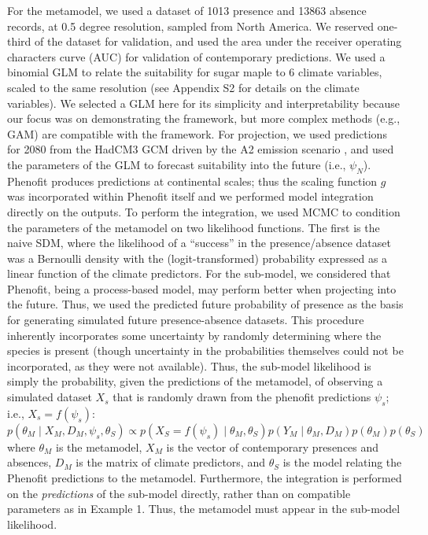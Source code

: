 \documentclass[11pt]{article}
\begin{document}
For the metamodel, we used a dataset of 1013 presence and 13863 absence records, at 0.5 degree resolution, sampled from North America.
We reserved one-third of the dataset for validation, and used the area under the receiver operating characters curve (AUC) for validation of contemporary predictions.
We used a binomial GLM to relate the suitability for sugar maple to 6 climate variables, scaled to the same resolution (see Appendix S2 for details on the climate variables).
We selected a GLM here for its simplicity and interpretability because our focus was on demonstrating the framework, but more complex methods (e.g., GAM) are compatible with the framework.
For projection, we used predictions for 2080 from the HadCM3 GCM \citep{Pope2000} driven by the A2 emission scenario \citep{Nakicenovic2000}, and used the parameters of the GLM to forecast suitability into the future (i.e., \(\psi_N\)).
Phenofit produces predictions at continental scales; thus the scaling function \(g\) was incorporated within Phenofit itself and we performed model integration directly on the outputs.
To perform the integration, we used \ac{MCMC} to condition the parameters of the metamodel  on two likelihood functions.
The first is the naive SDM, where the likelihood of a ``success'' in the presence/absence dataset was a Bernoulli density with the (logit-transformed) probability expressed as a linear function of the climate predictors.
For the sub-model, we considered that Phenofit, being a process-based model, may perform better when projecting into the future.
Thus, we used the predicted future probability of presence as the basis for generating simulated future presence-absence datasets.
This procedure inherently incorporates some uncertainty by randomly determining where the species is present (though uncertainty in the probabilities themselves could not be incorporated, as they were not available).
Thus, the sub-model likelihood is simply the probability, given the predictions of the metamodel, of observing a simulated dataset \(X_s\) that is randomly drawn from the phenofit predictions \(\psi_s\); i.e., \(X_s = f(\psi_s)\):
\begin{equation}
\label{eq:integrated2}
	p( \theta_M \mid X_M, D_M, \psi_s, \theta_S )
	\propto 
	p( X_S = f(\psi_s)\mid \theta_M, \theta_S )
	p( Y_M \mid \theta_M, D_M ) 
	p( \theta_M )
	p( \theta_S )
\end{equation}
where \(\theta_M\) is the metamodel, 
\(X_M\) is the vector of contemporary presences and absences, 
\(D_M\) is the matrix of climate predictors,
and \(\theta_S\) is the model relating the Phenofit predictions to the metamodel.
Furthermore, the integration is performed on the \emph{predictions} of the sub-model directly, rather than on compatible parameters as in Example 1. 
Thus, the metamodel must appear in the sub-model likelihood.
\end{document}
